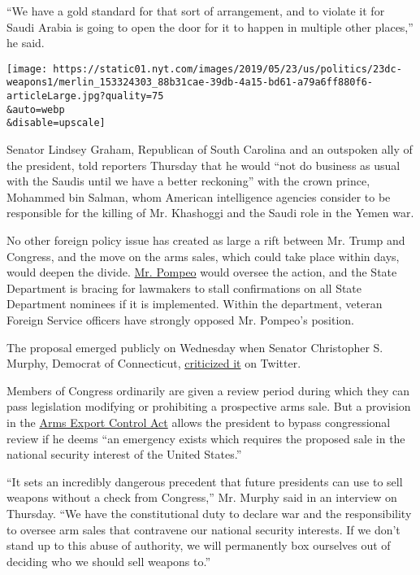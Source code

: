 ``We have a gold standard for that sort of arrangement, and to violate
it for Saudi Arabia is going to open the door for it to happen in
multiple other places,'' he said.

\texttt{[image: https://static01.nyt.com/images/2019/05/23/us/politics/23dc-weapons1/merlin\_153324303\_88b31cae-39db-4a15-bd61-a79a6ff880f6-articleLarge.jpg?quality=75\\\&auto=webp\\\&disable=upscale]}

Senator Lindsey Graham, Republican of South Carolina and an outspoken
ally of the president, told reporters Thursday that he would ``not do
business as usual with the Saudis until we have a better reckoning''
with the crown prince, Mohammed bin Salman, whom American intelligence
agencies consider to be responsible for the killing of Mr. Khashoggi and
the Saudi role in the Yemen war.

No other foreign policy issue has created as large a rift between Mr.
Trump and Congress, and the move on the arms sales, which could take
place within days, would deepen the divide.
\href{https://www.nytimes.com/2019/03/30/us/politics/pompeo-christian-policy.html}{Mr.
Pompeo} would oversee the action, and the State Department is bracing
for lawmakers to stall confirmations on all State Department nominees if
it is implemented. Within the department, veteran Foreign Service
officers have strongly opposed Mr. Pompeo's position.

The proposal emerged publicly on Wednesday when Senator Christopher S.
Murphy, Democrat of Connecticut,
\href{https://www.cnn.com/2019/05/22/politics/trump-murphy-saudi-arms-deal/index.html}{criticized
it} on Twitter.

Members of Congress ordinarily are given a review period during which
they can pass legislation modifying or prohibiting a prospective arms
sale. But a provision in the
\href{https://legcounsel.house.gov/Comps/Arms\%20Export\%20Control\%20Act.pdf}{Arms
Export Control Act} allows the president to bypass congressional review
if he deems ``an emergency exists which requires the proposed sale in
the national security interest of the United States.''

``It sets an incredibly dangerous precedent that future presidents can
use to sell weapons without a check from Congress,'' Mr. Murphy said in
an interview on Thursday. ``We have the constitutional duty to declare
war and the responsibility to oversee arm sales that contravene our
national security interests. If we don't stand up to this abuse of
authority, we will permanently box ourselves out of deciding who we
should sell weapons to.''


